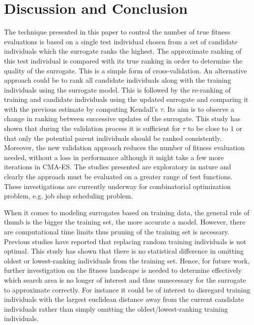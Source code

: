 \documentclass[10pt, conference]{IEEEtran} %
\begin{document}


\section{Discussion and Conclusion}\label{sec:Discussion}
The technique presented in this paper to control the number of true fitness evaluations is based on a single test individual chosen from a set of candidate individuals which the surrogate ranks the highest. The approximate ranking of this test individual is compared with its true ranking in order to determine the quality of the surrogate. This is a simple form of cross-validation. An alternative approach could be to rank all candidate individuals along with the training individuals  using the surrogate model. This is followed by the re-ranking of training and candidate individuals using the updated surrogate and comparing it with the previous estimate by computing Kendall's $\tau$. Its aim is to observe a change in ranking between successive updates of the surrogate. This study has shown that during the validation process it is sufficient for $\tau$ to be close to $1$ or that only the potential parent individuals  should be ranked consistently. Moreover, the new validation approach reduces the number of fitness evaluation needed, without a loss in performance although it might take a few more iterations in CMA-ES. The studies presented are exploratory in nature and clearly the approach must be evaluated on a greater range of test functions. %
These investigations are currently underway for combinatorial optimization problem, e.g. job shop scheduling problem.  %

When it comes to modeling surrogates based on training data, the general rule of thumb is the bigger the training set, the more accurate a model. However, there are computational time limits thus pruning of the training set is necessary. Previous studies \cite{Jin2005,Ratle1999} have reported that replacing random training individuals  is not optimal. This study has shown that there is no statistical difference in omitting oldest or lowest-ranking individuals  from the training set. Hence, for future work, further investigation on the fitness landscape is needed to determine effectively which search area is no longer of interest and thus unnecessary for the surrogate to approximate correctly. For instance it could be of interest to disregard training individuals  with the largest euclidean distance away from the current candidate individuals rather than simply omitting the oldest/lowest-ranking training individuals. 
\end{document}
